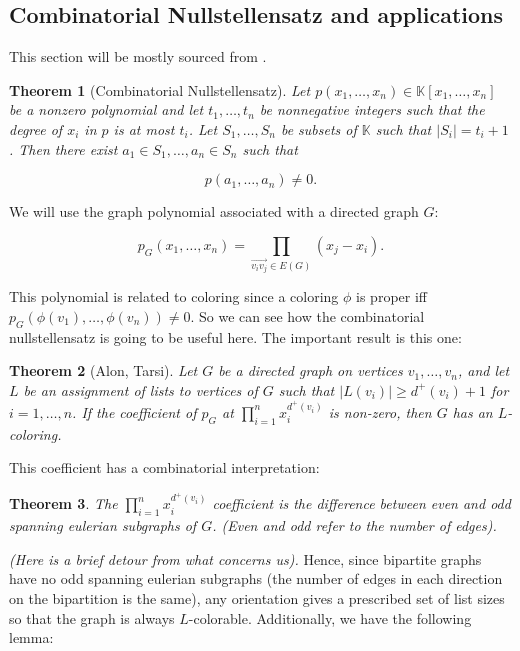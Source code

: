 \documentclass{article}
\newtheorem{theorem}{Theorem}
\begin{document}
\subsection{Combinatorial Nullstellensatz and applications}

This section will be mostly sourced from \cite{dvoraknullstellensatz}.

\begin{theorem}[Combinatorial Nullstellensatz]
Let $p(x_1, \ldots, x_n) \in \mathbb{K}[x_1, \ldots, x_n]$ be a nonzero polynomial and let $t_1, \ldots, t_n$ be nonnegative integers such that the degree of $x_i$ in $p$ is at most $t_i$. Let $S_1, \ldots, S_n$ be subsets of $\mathbb{K}$ such that $|S_i| = t_i+1$. Then there exist $a_1 \in S_1, \ldots, a_n \in S_n$ such that

$$
p(a_1, \ldots, a_n) \neq 0.
$$
\end{theorem}

We will use the graph polynomial associated with a directed graph $G$:

$$
p_G(x_1, \ldots, x_n) = \prod_{\overrightarrow{v_iv_j}\in E(G)} (x_j-x_i).
$$

This polynomial is related to coloring since a coloring $\phi$ is proper iff $p_G(\phi(v_1), \ldots, \phi(v_n)) \neq 0$. So we can see how the combinatorial nullstellensatz is going to be useful here. The important result is this one:

\begin{theorem}[Alon, Tarsi]
Let $G$ be a directed graph on vertices $v_1, \ldots, v_n$, and let $L$ be an assignment of lists to vertices of $G$ such that $|L(v_i)| \geq d^+(v_i)+1$ for $i = 1, \ldots, n$. If the coefficient of $p_G$ at $\prod_{i=1}^n x_i^{d^+(v_i)}$ is non-zero, then $G$ has an $L$-coloring.
\end{theorem}

This coefficient has a combinatorial interpretation:

\begin{theorem}
The $\prod_{i=1}^n x_i^{d^+(v_i)}$ coefficient is the difference between even and odd spanning eulerian subgraphs of $G$. (\emph{Even} and \emph{odd} refer to the number of edges).
\end{theorem}

\textit{(Here is a brief detour from what concerns us).} Hence, since bipartite graphs have no odd spanning eulerian subgraphs (the number of edges in each direction on the bipartition is the same), any orientation gives a prescribed set of list sizes so that the graph is always $L$-colorable. Additionally, we have the following lemma:
\end{document}
